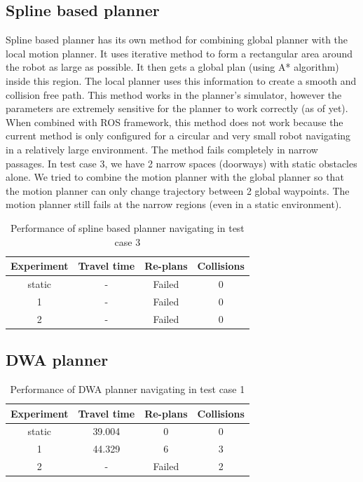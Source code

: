 \subsection{Spline based planner}%
\label{sub:eval_spline_based_planner_tc3}
Spline based planner has its own method for combining global planner with the local motion planner.
It uses iterative method to form a rectangular area around the robot as large as possible. It then
gets a global plan (using A* algorithm) inside this region. The local planner uses this information
to create a smooth and collision free path. This method works in the planner's simulator, however the
parameters are extremely sensitive for the planner to work correctly (as of yet). When combined with ROS framework,
this method does not work because the current method is only configured for a circular and very small
robot navigating in a relatively large environment. The method fails completely in narrow passages. 
In test case 3, we have 2 narrow spaces (doorways) with static obstacles alone. We tried to combine the motion
planner with the global planner so that the motion planner can only change trajectory between 2 global
waypoints. The motion planner still fails at the narrow regions (even in a static environment).

\begin{table}[H]
    \centering
    \begin{tabular}{cccc}
        \textbf{Experiment} & \textbf{Travel time} & \textbf{Re-plans} & \textbf{Collisions} \\\toprule
        static & \-- & Failed & 0 \\
             1 & \-- & Failed & 0 \\
             2 & \-- & Failed & 0 \\
    \end{tabular}
    \caption{Performance of spline based planner navigating in test case 3}\label{tab:perfomance_spline_test_case_3}
\end{table}

\subsection{DWA planner}%
\label{sub:eval_dwa_planner_tc3}

\begin{table}[H]
    \centering
    \begin{tabular}{cccc}
        \textbf{Experiment} & \textbf{Travel time} & \textbf{Re-plans} & \textbf{Collisions} \\\toprule
        static & 39.004 & 0 & 0 \\
             1 & 44.329 & 6 & 3 \\
             2 & \-- & Failed & 2 \\
    \end{tabular}
    \caption{Performance of DWA planner navigating in test case 1}\label{tab:perfomance_dwa_test_case_2}
\end{table}

